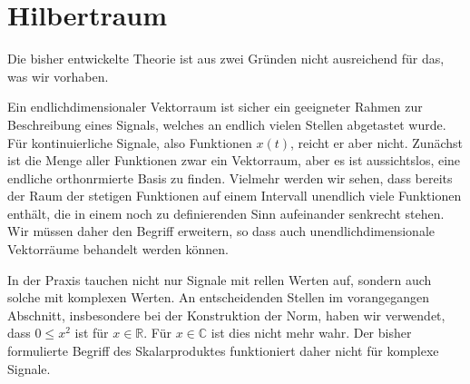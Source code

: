 %
%
%
\section{Hilbertraum
\label{section:hilbertraum}}
Die bisher entwickelte Theorie ist aus zwei Gründen nicht ausreichend für das,
was wir vorhaben.

Ein endlichdimensionaler Vektorraum ist sicher ein geeigneter Rahmen zur
Beschreibung eines Signals, welches an endlich vielen Stellen abgetastet
wurde.
Für kontinuierliche Signale, also Funktionen $x(t)$,  reicht er aber nicht.
Zunächst ist die Menge aller Funktionen zwar ein Vektorraum, aber es ist
aussichtslos, eine endliche orthonrmierte Basis zu finden.
Vielmehr werden wir sehen, dass bereits der Raum der stetigen Funktionen
auf einem Intervall unendlich viele Funktionen enthält, die in einem noch
zu definierenden Sinn aufeinander senkrecht stehen.
Wir müssen daher den Begriff erweitern, so dass auch unendlichdimensionale
Vektorräume behandelt werden können.

In der Praxis tauchen nicht nur Signale mit rellen Werten auf, sondern
auch solche mit komplexen Werten.
An entscheidenden Stellen im vorangegangen Abschnitt, insbesondere bei
der Konstruktion der Norm, haben wir verwendet,
dass $0 \le x^2$ ist für $x\in\mathbb R$. Für $x\in\mathbb C$ ist dies
nicht mehr wahr.
Der bisher formulierte Begriff des Skalarproduktes funktioniert daher
nicht für komplexe Signale.


